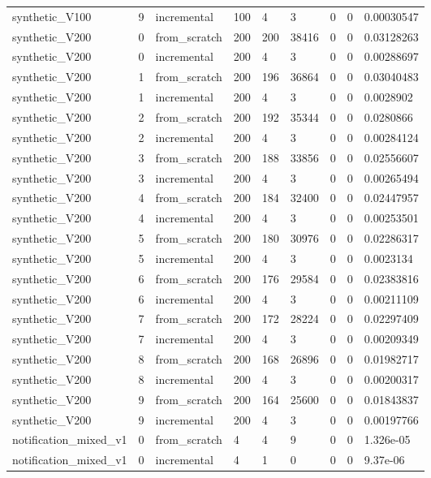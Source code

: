 \begin{table}[t]
\begin{tabular}{lllllllll}
synthetic\_V100 & 9 & incremental & 100 & 4 & 3 & 0 & 0 & 0.00030547 \\
synthetic\_V200 & 0 & from\_scratch & 200 & 200 & 38416 & 0 & 0 & 0.03128263 \\
synthetic\_V200 & 0 & incremental & 200 & 4 & 3 & 0 & 0 & 0.00288697 \\
synthetic\_V200 & 1 & from\_scratch & 200 & 196 & 36864 & 0 & 0 & 0.03040483 \\
synthetic\_V200 & 1 & incremental & 200 & 4 & 3 & 0 & 0 & 0.0028902 \\
synthetic\_V200 & 2 & from\_scratch & 200 & 192 & 35344 & 0 & 0 & 0.0280866 \\
synthetic\_V200 & 2 & incremental & 200 & 4 & 3 & 0 & 0 & 0.00284124 \\
synthetic\_V200 & 3 & from\_scratch & 200 & 188 & 33856 & 0 & 0 & 0.02556607 \\
synthetic\_V200 & 3 & incremental & 200 & 4 & 3 & 0 & 0 & 0.00265494 \\
synthetic\_V200 & 4 & from\_scratch & 200 & 184 & 32400 & 0 & 0 & 0.02447957 \\
synthetic\_V200 & 4 & incremental & 200 & 4 & 3 & 0 & 0 & 0.00253501 \\
synthetic\_V200 & 5 & from\_scratch & 200 & 180 & 30976 & 0 & 0 & 0.02286317 \\
synthetic\_V200 & 5 & incremental & 200 & 4 & 3 & 0 & 0 & 0.0023134 \\
synthetic\_V200 & 6 & from\_scratch & 200 & 176 & 29584 & 0 & 0 & 0.02383816 \\
synthetic\_V200 & 6 & incremental & 200 & 4 & 3 & 0 & 0 & 0.00211109 \\
synthetic\_V200 & 7 & from\_scratch & 200 & 172 & 28224 & 0 & 0 & 0.02297409 \\
synthetic\_V200 & 7 & incremental & 200 & 4 & 3 & 0 & 0 & 0.00209349 \\
synthetic\_V200 & 8 & from\_scratch & 200 & 168 & 26896 & 0 & 0 & 0.01982717 \\
synthetic\_V200 & 8 & incremental & 200 & 4 & 3 & 0 & 0 & 0.00200317 \\
synthetic\_V200 & 9 & from\_scratch & 200 & 164 & 25600 & 0 & 0 & 0.01843837 \\
synthetic\_V200 & 9 & incremental & 200 & 4 & 3 & 0 & 0 & 0.00197766 \\
notification\_mixed\_v1 & 0 & from\_scratch & 4 & 4 & 9 & 0 & 0 & 1.326e-05 \\
notification\_mixed\_v1 & 0 & incremental & 4 & 1 & 0 & 0 & 0 & 9.37e-06 \\

\end{tabular}
\end{table}
